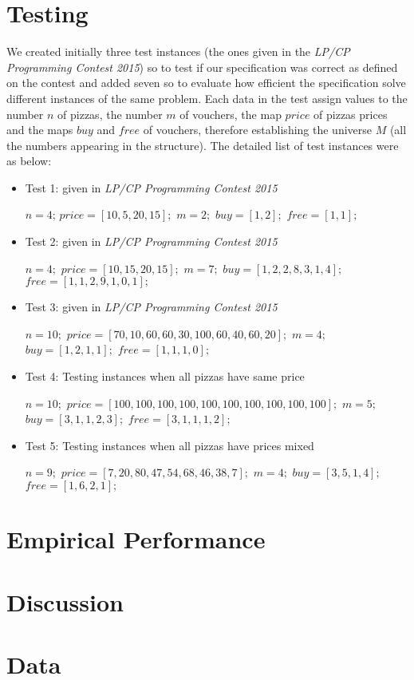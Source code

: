 \documentclass[conference]{IEEEtran}
\begin{document}
\section{Testing}
We created initially three test instances (the ones given in the \textit{LP/CP Programming Contest 2015}) so to test if our specification was correct as defined on the contest and added seven so to evaluate how efficient the specification solve different instances of the same problem. Each data in the test assign values to the number $n$ of pizzas, the number $m$ of vouchers, the map $price$ of pizzas prices and the maps $buy$ and $free$ of vouchers, therefore establishing the universe $M$ (all the numbers appearing in the structure). The detailed list of test instances were as below:
\begin{itemize}
\item Test 1: given in \textit{LP/CP Programming Contest 2015}
\begin{algorithmic}
\State $n = 4$;
\State $price = [10,5,20,15];$
\State $m = 2;$
\State $buy = [1,2];$
\State $free = [1,1];$
\\
\end{algorithmic}
\item Test 2: given in \textit{LP/CP Programming Contest 2015}
\begin{algorithmic}
\State $n = 4;$
\State $price = [10,15,20,15];$
\State $m = 7;$
\State $buy = [1,2,2,8,3,1,4];$
\State $free = [1,1,2,9,1,0,1];$
\\
\end{algorithmic}
\item Test 3: given in \textit{LP/CP Programming Contest 2015}
\begin{algorithmic}
\State $n = 10;$
\State $price = [70,10,60,60,30,100,60,40,60,20];$
\State $m = 4;$
\State $buy = [1,2,1,1];$
\State $free = [1,1,1,0];$
\\
\end{algorithmic}
\item Test 4: Testing instances when all pizzas have same price 
\begin{algorithmic}
\State $n = 10;$
\State $price = [100,100,100,100,100,100,100,100,100,100];$
\State $m = 5;$
\State $buy = [3,1,1,2,3];$
\State $free = [3,1,1,1,2];$
\\
\end{algorithmic}
\item Test 5: Testing instances when all pizzas have prices mixed 
\begin{algorithmic}
\State $n = 9;$
\State $price = [7,20,80,47,54,68,46,38,7];$
\State $m = 4;$
\State $buy = [3,5,1,4];$
\State $free = [1,6,2,1];$
\\
\end{algorithmic}
\end{itemize}
\section{Empirical Performance}
\section{Discussion}
\section{Data}
\end{document}
